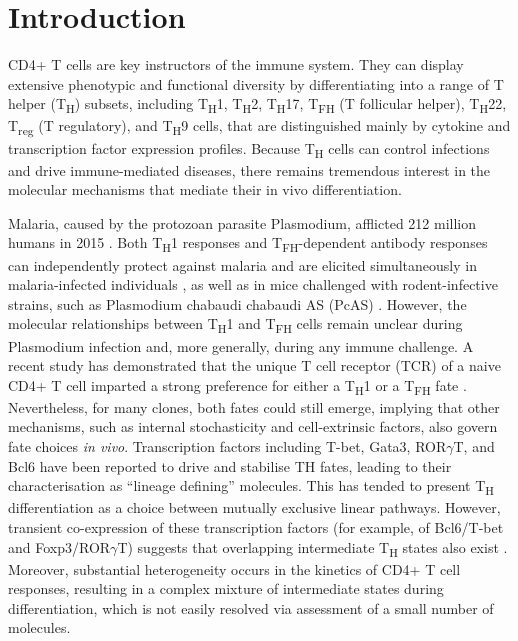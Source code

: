 \section{Introduction}

CD4+ T cells are key instructors of the immune system. They can display extensive phenotypic and functional diversity by differentiating into a range of T helper (T\textsubscript{H}) subsets, including T\textsubscript{H}1, T\textsubscript{H}2, T\textsubscript{H}17, T\textsubscript{FH} (T follicular helper), T\textsubscript{H}22, T\textsubscript{reg} (T regulatory), and T\textsubscript{H}9 cells, that are distinguished mainly by cytokine and transcription factor expression profiles. Because T\textsubscript{H} cells can control infections and drive immune-mediated diseases, there remains tremendous interest in the molecular mechanisms that mediate their in vivo differentiation.

Malaria, caused by the protozoan parasite Plasmodium, afflicted 212 million humans in 2015 \cite{Organization2016-tj}. Both T\textsubscript{H}1 responses \cite{Pinzon-Charry2010-zk} and T\textsubscript{FH}-dependent antibody responses \cite{Boyle2015-yg} can independently protect against malaria and are elicited simultaneously in malaria-infected individuals \cite{Obeng-Adjei2015-dc}, as well as in mice challenged with rodent-infective strains, such as Plasmodium chabaudi chabaudi AS (PcAS) \cite{Perez-Mazliah2014-cq}. However, the molecular relationships between T\textsubscript{H}1 and T\textsubscript{FH} cells remain unclear during Plasmodium infection and, more generally, during any immune challenge. A recent study has demonstrated that the unique T cell receptor (TCR) of a naive CD4+ T cell imparted a strong preference for either a T\textsubscript{H}1 or a T\textsubscript{FH} fate \cite{Tubo2013-zg}. Nevertheless, for many clones, both fates could still emerge, implying that other mechanisms, such as internal stochasticity and cell-extrinsic factors, also govern fate choices \textit{in vivo}. Transcription factors including T-bet, Gata3, ROR\( \gamma \)T, and Bcl6 have been reported to drive and stabilise TH fates, leading to their characterisation as “lineage defining” molecules. This has tended to present T\textsubscript{H} differentiation as a choice between mutually exclusive linear pathways. However, transient co-expression of these transcription factors (for example, of Bcl6/T-bet and Foxp3/ROR\( \gamma \)T) suggests that overlapping intermediate T\textsubscript{H} states also exist . Moreover, substantial heterogeneity occurs in the kinetics of CD4+ T cell responses, resulting in a complex mixture of intermediate states during differentiation, which is not easily resolved via assessment of a small number of molecules.

